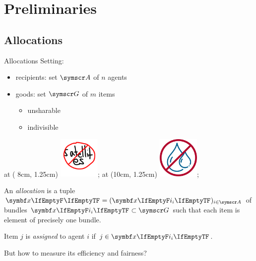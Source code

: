 \section{Preliminaries}

\subsection{Allocations}
\begin{frame}{Allocations}
	Setting:
	\adjustfortopitem
	\begin{itemize}
		\item
		recipients: set \(\agents\) of \(n\) agents

		\item
		goods: set \(\goods\) of \(m\) items
		\begin{itemize}
			\item
			unsharable

			\item
			indivisible
		\end{itemize}
	\end{itemize}
	\beamerimage at ( 8cm, 1.25cm) {\includegraphics[height=2cm]{img/nosatellites}};
	\beamerimage at (10cm, 1.25cm) {\includegraphics[height=2cm]{img/nowater}};
	\vspace{-3ex}
	\begin{definition}[1]
		An \emph{allocation} is a tuple
		\(\alloc[][] = (\alloc)_{i \in \agents}\)
		of bundles \(\alloc \subset \goods\) such that each item is element of precisely one bundle.

		Item \(j\) is \emph{assigned} to agent \(i\) if \(j \in \alloc\).
	\end{definition}

	But how to measure its efficiency and fairness?
\end{frame}






